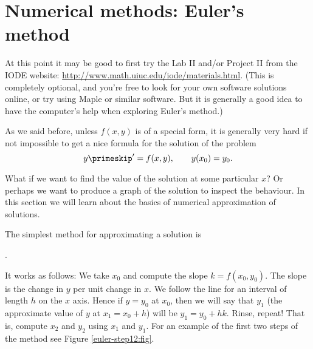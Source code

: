 \section{Numerical methods: Euler's method} \label{numer:section}

At this point it may be good to first try the
Lab II and/or Project II from the
IODE website: \href{http://www.math.uiuc.edu/iode/materials.html}{http://www.math.uiuc.edu/iode/materials.html}. (This is completely optional, and you're free to look for your own software solutions online, or try using Maple or similar software. But it is generally a good idea to have the computer's help when exploring Euler's method.)

\medskip


As we said before, unless $f(x,y)$ is of a special form,
it is generally very hard
if not impossible to get a nice formula for the solution of the problem
\begin{equation*}
y\primeskip' = f(x,y), \qquad y(x_0) = y_0 .
\end{equation*}

What if we want to find the value of the solution at some particular $x$?
Or perhaps we want to produce a graph of the solution to inspect the
behaviour.  In this section we will learn about the basics of numerical
approximation of solutions.

The simplest method for approximating a solution is
%

.  

It works as follows:
We take $x_0$ and compute the slope $k = f(x_0,y_0)$.  The slope is the
change in $y$ per unit change in $x$.  We follow the line for an interval of
length $h$ on the $x$ axis.  Hence if $y = y_0$ at $x_0$, then we will say that
$y_1$ (the approximate value of $y$ at $x_1 = x_0 + h$) will be
$y_1 = y_0 + h k$.
Rinse, repeat!  That is, compute $x_2$ and $y_2$ using $x_1$ and $y_1$.
For an example of the first two steps of the method see Figure
\ref{euler-step12:fig}.


